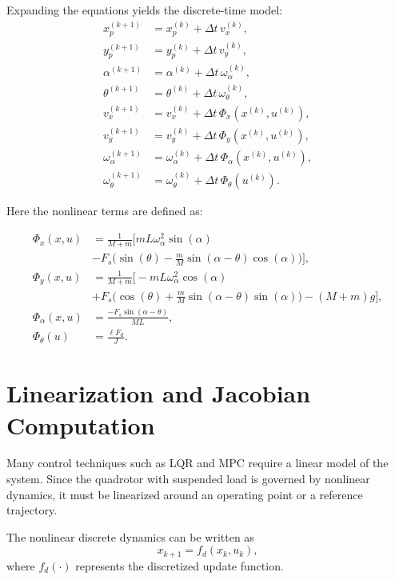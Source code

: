 \documentclass[a4paper,11pt,oneside]{book}
\begin{document}
Expanding the equations yields the discrete-time model:
\begin{align}
x_p^{(k+1)} &= x_p^{(k)} + \Delta t \, v_x^{(k)}, \\
y_p^{(k+1)} &= y_p^{(k)} + \Delta t \, v_y^{(k)}, \\
\alpha^{(k+1)} &= \alpha^{(k)} + \Delta t \, \omega_\alpha^{(k)}, \\
\theta^{(k+1)} &= \theta^{(k)} + \Delta t \, \omega_\theta^{(k)}, \\
v_x^{(k+1)} &= v_x^{(k)} + \Delta t \, \Phi_x(x^{(k)},u^{(k)}), \\
v_y^{(k+1)} &= v_y^{(k)} + \Delta t \, \Phi_y(x^{(k)},u^{(k)}), \\
\omega_\alpha^{(k+1)} &= \omega_\alpha^{(k)} + \Delta t \, \Phi_\alpha(x^{(k)},u^{(k)}), \\
\omega_\theta^{(k+1)} &= \omega_\theta^{(k)} + \Delta t \, \Phi_\theta(u^{(k)}).
\end{align}



Here the nonlinear terms are defined as:

\begin{align}
\Phi_x(x,u) &= \frac{1}{M+m}\Big[mL \omega_\alpha^2 \sin(\alpha) \nonumber\\
&- F_s\Big(\sin(\theta) - \tfrac{m}{M}\sin(\alpha-\theta)\cos(\alpha)\Big)\Big], \\
\Phi_y(x,u) &= \frac{1}{M+m}\Big[-mL \omega_\alpha^2 \cos(\alpha) \nonumber\\
&+ F_s\Big(\cos(\theta) + \tfrac{m}{M}\sin(\alpha-\theta)\sin(\alpha)\Big) - (M+m)g\Big], \\
\Phi_\alpha(x,u) &= \frac{-F_s \sin(\alpha-\theta)}{ML}, \\
\Phi_\theta(u) &= \frac{\ell F_d}{J}.
\end{align}


\section{Linearization and Jacobian Computation}
\label{sec:Jacobian}

Many control techniques such as LQR and MPC require a linear model of the system. 
Since the quadrotor with suspended load is governed by nonlinear dynamics, 
it must be linearized around an operating point or a reference trajectory.  

The nonlinear discrete dynamics can be written as
\begin{equation}
x_{k+1} = f_d(x_k, u_k),
\end{equation}
where $f_d(\cdot)$ represents the discretized update function.  
\end{document}
